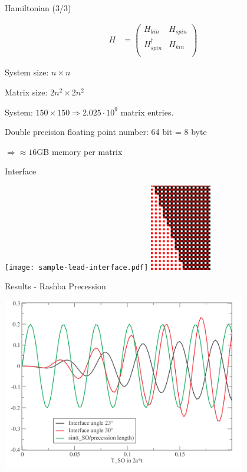 \documentclass{beamer}
\newcommand{\inp}[1]{\ensuremath{\left(#1\right)}}
\begin{document}
\begin{frame}{Hamiltonian (3/3)}
    \begin{center}
        \begin{align*}
            H &= \inp{
            \begin{array}{cc}
                    H_{kin}  & H_{spin} \\
                    H_{spin}^\dagger & H_{kin} \\
            \end{array}}
        \end{align*}
    \end{center}

    System size: $n \times n$

    Matrix size: $2n^2 \times 2n^2$

    System: $150 \times 150 \Rightarrow 2.025 \cdot 10^9$ matrix entries.

    Double precision floating point number: 64 bit = 8 byte

    $\Rightarrow \approx 16$GB memory per matrix

\end{frame}

\begin{frame}{Interface}
    \begin{center}
        \texttt{[image: sample-lead-interface.pdf]}%
        \hspace{0.1\textwidth}%
        \includegraphics[width=0.2\textwidth]{hopping.png}
    \end{center}
\end{frame}

\begin{frame}{Results - Rashba Precession}
    \begin{center}
        \includegraphics[width=0.8\textwidth]{interface-precession.png}
    \end{center}
\end{frame}
\end{document}
